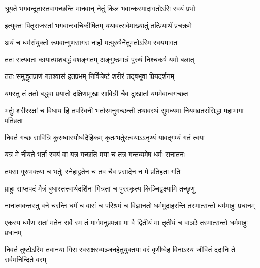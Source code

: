 \begin{center}
\twolineshloka
{श्रूयते भगवन्दूतास्तवागच्छन्ति मानवान्}
{नेतुं किल भवान्कस्मादागतोऽसि स्वयं प्रभो}




\twolineshloka
{इत्युक्तः पितृराजस्तां भगवान्स्वचिकीर्षितम्}
{यथावत्सर्वमाख्यातुं तत्प्रियार्थं प्रचक्रमे}


\twolineshloka
{अयं च धर्मसंयुक्तो रूपवान्गुणसागरः}
{नार्हो मत्पुरुषैर्नेतुमतोऽस्मि स्वयमागतः}


\twolineshloka
{ततः सत्यवतः कायात्पाशबद्धं वशङ्गतम्}
{अङ्गुष्ठमात्रं पुरुषं निश्चकर्ष यमो बलात्}


\twolineshloka
{ततः समुद्धृतप्राणं गतश्वासं हतप्रभम्}
{निर्विचेष्टं शरीरं तद्बभूवा प्रियदर्शनम्}


\twolineshloka
{यमस्तु तं ततो बद्ध्वा प्रयातो दक्षिणामुखः}
{सावित्री चैव दुःखार्ता यममेवान्वगच्छत}


\threelineshloka
{भर्तुः शरीररक्षां च विधाय हि तपस्विनी}
{भर्तारमनुगच्छन्ती  तथावस्थं सुमध्यमा}
{नियमव्रतसंसिद्धा महाभागा पतिव्रता}




\twolineshloka
{निवर्त गच्छ सावित्रि कुरुष्वास्यौर्ध्वदैहिकम्}
{कृतम्भर्तुस्त्वयाऽऽनृण्यं यावद्गम्यं गतं त्वया}




\twolineshloka
{यत्र मे नीयते भर्ता स्वयं वा यत्र गच्छति}
{मया च तत्र गन्तव्यमेष धर्मः सनातनः}


\twolineshloka
{तपसा गुरुभक्त्या च भर्तुः स्नेहाद्व्रतेन च}
{तव चैव प्रसादेन न मे प्रतिहता गतिः}


\twolineshloka
{प्राहुः साप्तपदं मैत्रं बुधास्तत्त्वार्थदर्शिनः}
{मित्रतां च पुरस्कृत्य किञ्चिद्वक्ष्यामि तच्छृणु}


\fourlineindentedshloka
{नानात्मवन्तस्तु वने चरन्ति}
{धर्मं च वासं च परिश्रमं च}
{विज्ञानतो धर्ममुदाहरन्ति}
{तस्मात्सन्तो धर्ममाहुः प्रधानम्}


\fourlineindentedshloka
{एकस्य धर्मेण सतां मतेन}
{सर्वे स्म तं मार्गमनुप्रपन्नाः}
{मा वै द्वितीयं मा तृतीयं च वाञ्छे}
{तस्मात्सन्तो धर्ममाहुः प्रधानम्}




\fourlineindentedshloka
{निवर्त तुष्टोऽस्मि तवानया गिरा}
{स्वराक्षरव्यञ्जनहेतुयुक्तया}
{वरं वृणीष्वेह विनाऽस्य जीवितं}
{ददानि ते सर्वमनिन्दिते वरम्}





\end{center}
